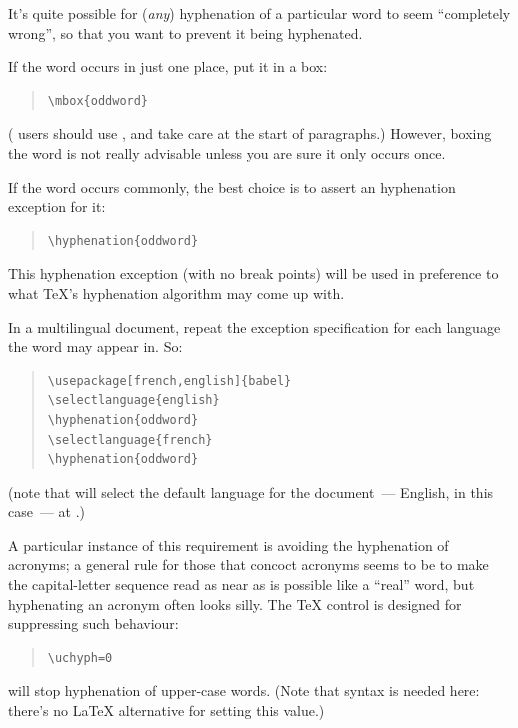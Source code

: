 
It's quite possible for (\emph{any}) hyphenation of a particular word
to seem ``completely wrong'', so that you want to prevent it being
hyphenated.

If the word occurs in just one place, put it in a box:
\begin{quote}
\begin{verbatim}
\mbox{oddword}
\end{verbatim}
\end{quote}
(\plaintex{} users should use , and take care at the start
of paragraphs.)  However, boxing the word is not really advisable
unless you are sure it only occurs once.

If the word occurs commonly, the best choice is to assert an
hyphenation exception for it:
\begin{quote}
\begin{verbatim}
\hyphenation{oddword}
\end{verbatim}
\end{quote}
This hyphenation exception (with no break points) will be used in
preference to what \TeX{}'s hyphenation algorithm may come up with.

In a multilingual document, repeat the exception specification for
each language the word may appear in.  So:
\begin{quote}
\begin{verbatim}
\usepackage[french,english]{babel}
\selectlanguage{english}
\hyphenation{oddword}
\selectlanguage{french}
\hyphenation{oddword}
\end{verbatim}
\end{quote}
(note that  will select the default language for the
document~--- English, in this case~--- at .)

A particular instance of this requirement is avoiding the hyphenation
of acronyms; a general rule for those that concoct acronyms seems to
be to make the capital-letter sequence read as near as is possible
like a ``real'' word, but hyphenating an acronym often looks silly.
The \TeX{} control  is designed for suppressing such
behaviour:
\begin{quote}
\begin{verbatim}
\uchyph=0
\end{verbatim}
\end{quote}
will stop hyphenation of upper-case words.  (Note that \plaintex{}
syntax is needed here: there's no \LaTeX{} alternative for setting
this value.)


